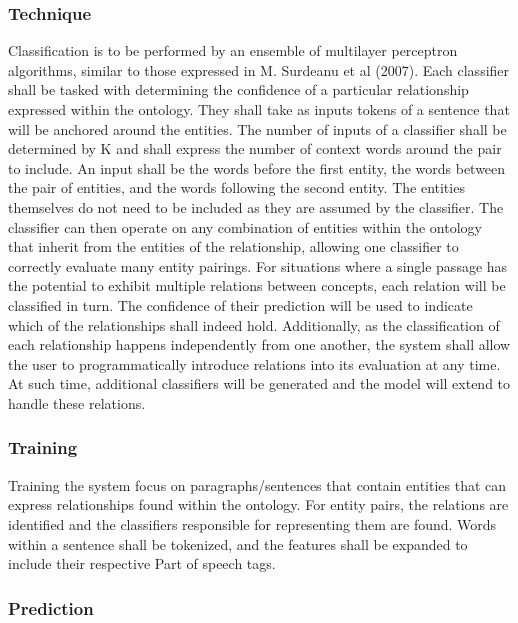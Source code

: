 \documentclass[12pt]{article} %
\begin{document}
\subsubsection{Technique}

Classification is to be performed by an ensemble of multilayer perceptron algorithms, similar to those expressed in M. Surdeanu et al (2007). Each classifier shall be tasked with determining the confidence of a particular relationship expressed within the ontology. They shall take as inputs tokens of a sentence that will be anchored around the entities. The number of inputs of a classifier shall be determined by K and shall express the number of context words around the pair to include. An input shall be the words before the first entity, the words between the pair of entities, and the words following the second entity. The entities themselves do not need to be included as they are assumed by the classifier. The classifier can then operate on any combination of entities within the ontology that inherit from the entities of the relationship, allowing one classifier to correctly evaluate many entity pairings. For situations where a single passage has the potential to exhibit multiple relations between concepts, each relation will be classified in turn. The confidence of their prediction will be used to indicate which of the relationships shall indeed hold. Additionally, as the classification of each relationship happens independently from one another, the system shall allow the user to programmatically introduce relations into its evaluation at any time. At such time, additional classifiers will be generated and the model will extend to handle these relations.

\subsubsection{Training}

Training the system focus on paragraphs/sentences that contain entities that can express relationships found within the ontology. For entity pairs, the relations are identified and the classifiers responsible for representing them are found. Words within a sentence shall be tokenized, and the features shall be expanded to include their respective Part of speech tags.

\subsubsection{Prediction}
\end{document}

